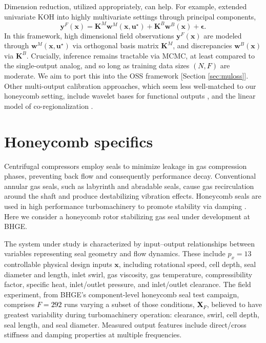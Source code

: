 \documentclass[12pt]{article}
\newcommand{\blunew}[1]{\textcolor{black}{#1}} %
\begin{document}
Dimension reduction, utilized appropriately, can help.  For example,
\cite{Higdon2008} extended univariate KOH into highly multivariate settings
through principal components,
\begin{equation}
\mathbf{y}^F(\mathbf{x}) = \mathbf{K}^M \mathbf{w}^M(\mathbf{x}, \mathbf{u}^\star)
 + \mathbf{K}^B\mathbf{w}^B(\mathbf{x}) +\mathbf{\epsilon}. 
  \label{eq:pccali}
\end{equation}
In this framework, high dimensional field observations
$\mathbf{y}^F(\mathbf{x})$ are modeled through $\mathbf{w}^M(\mathbf{x},
\mathbf{u}^\star)$ via orthogonal basis matrix $\mathbf{K}^M$, and discrepancies
$\mathbf{w}^B(\mathbf{x})$ via $\mathbf{K}^B$. Crucially, inference remains
tractable via MCMC, at least compared to the single-output analog, and so long
as training data sizes \blunew{$(N, F)$} are moderate. We aim to port this into the
OSS framework [Section \ref{sec:muloss}]. Other multi-output calibration
approaches, which seem less well-matched to our honeycomb setting, include
wavelet bases for functional outputs \citep{Bayarri2007b}, and the linear
model of co-regionalization \citep[LMC;][]{Paulo:2012}.



\section{Honeycomb specifics}
\label{sec:honeycomb}

Centrifugal compressors employ seals to minimize leakage in gas compression
phases,  preventing back flow and consequently performance decay. Conventional
annular gas seals, such as labyrinth and abradable seals, cause gas
recirculation around the shaft and produce destabilizing vibration effects.
Honeycomb seals are used in high performance turbomachinery to
promote stability via damping \citep[see, e.g.][]{childs}. Here we consider a
honeycomb rotor stabilizing gas seal under development at BHGE.

The system under study is characterized by input--output relationships between
variables representing seal geometry and flow dynamics. These include $p_x=13$
controllable physical design inputs $\mathbf{x}$, including rotational speed,
cell depth, seal diameter and length, inlet swirl, gas viscosity, gas
temperature, compressibility factor, specific heat, inlet/outlet pressure, and
inlet/outlet clearance. The field experiment, from BHGE's component-level
honeycomb seal test campaign, comprises \blunew{$F = 292$} runs varying a subset of
those conditions, \blunew{$\mathbf{X}_{F}$}, believed to have greatest variability
during turbomachinery operation: clearance, swirl, cell depth, seal length,
and seal diameter. Measured output features include direct/cross stiffness and
damping properties at multiple frequencies.
\end{document}
